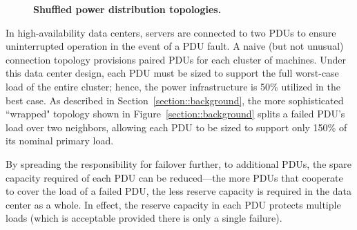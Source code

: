 \begin{figure}[t]
{\label{figure::ring}
}
\hspace{0.5in}

\vspace{-0.10 in}
\caption{ \textbf{Shuffled power distribution topologies.} }
\vspace{-0.15 in}
\label{figure::topologies}
\end{figure}

In high-availability data centers, servers are connected to two PDUs to ensure uninterrupted operation in the event of a PDU fault.  A naive (but not unusual) connection topology provisions paired PDUs for each cluster of machines.  Under this data center design, each PDU must be sized to support the full worst-case load of the entire cluster; hence, the power infrastructure is 50\% utilized in the best case. As described in Section~\ref{section::background}, the more sophisticated ``wrapped" topology shown in Figure~\ref{section::background} splits a failed PDU's load over two neighbors, allowing each PDU to be sized to support only 150\% of its nominal primary load.  

By spreading the responsibility for failover further, to additional PDUs, the spare capacity required of each PDU can be reduced---the more PDUs that cooperate to cover the load of a failed PDU, the less reserve capacity is required in the data center as a whole.  In effect, the reserve capacity in each PDU protects multiple loads (which is acceptable provided there is only a single failure). 

